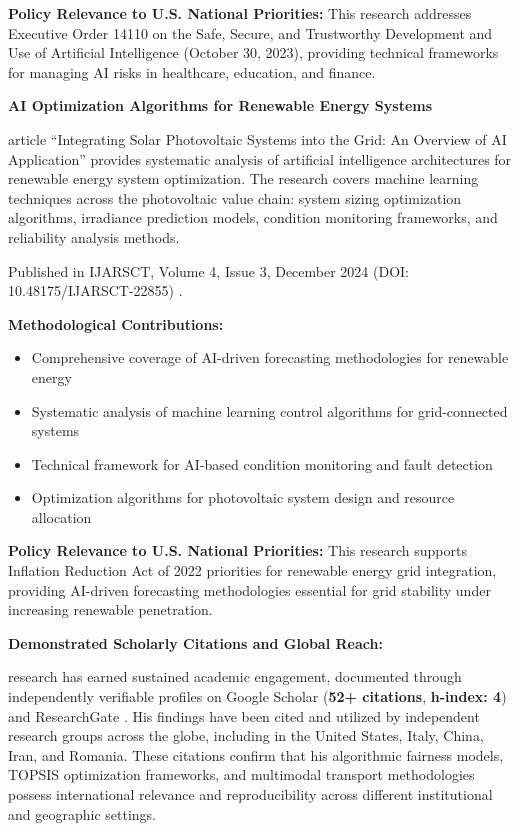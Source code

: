 \textbf{Policy Relevance to U.S. National Priorities:} This research addresses Executive Order 14110 on the Safe, Secure, and Trustworthy Development and Use of Artificial Intelligence (October 30, 2023), providing technical frameworks for managing AI risks in healthcare, education, and finance.

\textbf{AI Optimization Algorithms for Renewable Energy Systems}

\drs article ``Integrating Solar Photovoltaic Systems into the Grid: An Overview of AI Application'' provides systematic analysis of artificial intelligence architectures for renewable energy system optimization. The research covers machine learning techniques across the photovoltaic value chain: system sizing optimization algorithms, irradiance prediction models, condition monitoring frameworks, and reliability analysis methods.

Published in IJARSCT, Volume 4, Issue 3, December 2024 (DOI: 10.48175/IJARSCT-22855) \cite{SR1}.

\textbf{Methodological Contributions:}
\begin{itemize}
    \item Comprehensive coverage of AI-driven forecasting methodologies for renewable energy
    \item Systematic analysis of machine learning control algorithms for grid-connected systems
    \item Technical framework for AI-based condition monitoring and fault detection
    \item Optimization algorithms for photovoltaic system design and resource allocation
\end{itemize}

\textbf{Policy Relevance to U.S. National Priorities:} This research supports Inflation Reduction Act of 2022 priorities for renewable energy grid integration, providing AI-driven forecasting methodologies essential for grid stability under increasing renewable penetration.

\textbf{Demonstrated Scholarly Citations and Global Reach:}

\drs research has earned sustained academic engagement, documented through independently verifiable profiles on Google Scholar (\textbf{52+ citations}, \textbf{h-index: 4}) \cite{SR11} and ResearchGate \cite{SR12}. His findings have been cited and utilized by independent research groups across the globe, including in the United States, Italy, China, Iran, and Romania. These citations confirm that his algorithmic fairness models, TOPSIS optimization frameworks, and multimodal transport methodologies possess international relevance and reproducibility across different institutional and geographic settings.

